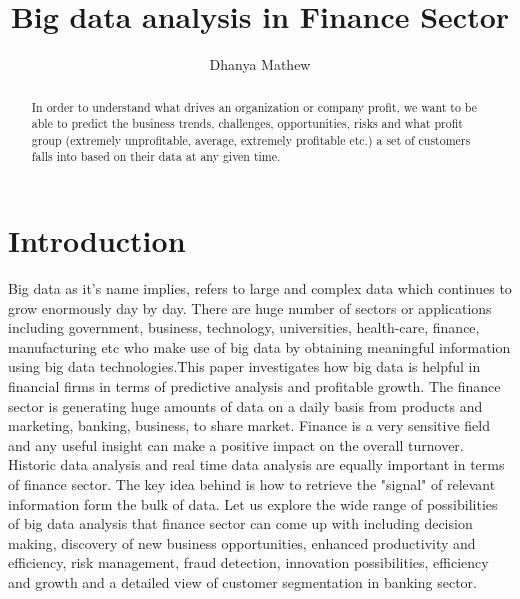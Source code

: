 \documentclass[sigconf]{acmart}
\begin{document}
\title{Big data analysis in Finance Sector}


\author{Dhanya Mathew}

\renewcommand{\shortauthors}{B. Trovato et al.}


\begin{abstract}

In order to understand what drives an organization or company profit, we want to be able to predict the business trends, challenges, opportunities, risks and what profit group (extremely unprofitable, average, extremely profitable etc.) a set of customers falls into based on their data at any given time.

\end{abstract}



\maketitle

\section{Introduction}

Big data as it's name implies, refers to large and complex data which continues to grow enormously day by day. There are huge number of sectors or applications including government, business, technology, universities, health-care, finance, manufacturing etc who make use of big data by obtaining meaningful information using big data technologies.\cite{/wiki/Big_data}This paper investigates how big data is helpful in financial firms in terms of predictive analysis and profitable growth. The finance sector is generating huge amounts of data on a daily basis from products and marketing, banking, business, to share market. Finance is a very sensitive field and any useful insight can make a positive impact on the overall turnover. Historic data analysis and real time data analysis are equally important in terms of finance sector. The key idea behind is how to retrieve the "signal" of relevant information form the bulk of data. Let us explore the wide range of possibilities of big data analysis that finance sector can come up with including decision making, discovery of new business opportunities, enhanced productivity and efficiency, risk management, fraud detection, innovation possibilities, efficiency and growth and a detailed view of customer segmentation in banking sector.\cite{Accenture-Next-Generation-Financial}
\end{document}
